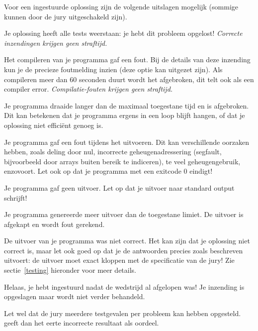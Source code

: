 Voor een ingestuurde oplossing zijn de volgende uitslagen mogelijk
(sommige kunnen door de jury uitgeschakeld zijn).

\begin{description}[\setleftmargin{4.5cm}]
\item[CORRECT]
Je oplossing heeft alle tests weerstaan: je hebt dit probleem opgelost!
\textit{Correcte inzendingen krijgen geen straftijd.}

\item[COMPILER-ERROR]
Het compileren van je programma gaf een fout. Bij de details
van deze inzending kun je de precieze foutmelding inzien
(deze optie kan uitgezet zijn).
Als compileren meer dan 60 seconden duurt wordt het afgebroken,
dit telt ook als een compiler error.
\textit{Compilatie-fouten krijgen geen straftijd.}

\item[TIMELIMIT]
Je programma draaide langer dan de maximaal toegestane tijd en is
afgebroken. Dit kan betekenen dat je programma ergens in een loop
blijft hangen, of dat je oplossing niet effici\"ent genoeg is.

\item[RUN-ERROR]
Je programma gaf een fout tijdens het uitvoeren. Dit kan verschillende
oorzaken hebben, zoals deling door nul, incorrecte geheugen\-adressering
(segfault, bijvoorbeeld door arrays buiten bereik te indiceren), te
veel geheugengebruik, enzovoort.
Let ook op dat je programma met een exitcode 0 eindigt!

\item[NO-OUTPUT]
Je programma gaf geen uitvoer. Let op dat je uitvoer naar standard
output schrijft!

\item[OUTPUT-LIMIT]
Je programma genereerde meer uitvoer dan de toegestane limiet. De
uitvoer is afgekapt en wordt fout gerekend.

\item[WRONG-ANSWER]
De uitvoer van je programma was niet correct. Het kan zijn dat je
oplossing niet correct is, maar let ook goed op dat je de antwoorden
precies zoals beschreven uitvoert: de uitvoer moet exact kloppen met
de specificatie van de jury! Zie sectie~\ref{testing} hieronder voor
meer details.

\item[TOO-LATE]
Helaas, je hebt ingestuurd nadat de wedstrijd al afgelopen was!
Je inzending is opgeslagen maar wordt niet verder behandeld.

Let wel dat de jury meerdere testgevalen per probleem kan hebben opgesteld.
\DOMjudge geeft dan het eerte incorrecte resultaat als oordeel.

\end{description}


